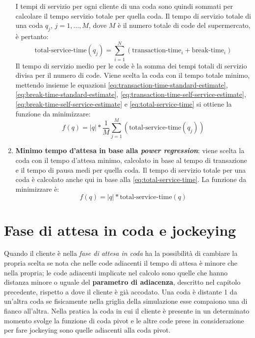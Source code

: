 \begin{enumerate}
I tempi di servizio per ogni cliente di una coda sono quindi sommati per calcolare il tempo servizio totale per quella coda. Il tempo di servizio totale di una coda $q_j$, $j = 1,\ldots ,M$, dove $M$ è il numero totale di code del supermercato, è pertanto:
\begin{equation}\label{eq:total-service-time}
\text{total-service-time}(q_j) = \sum\limits_{i=1}^N \left( \text{transaction-time}_i + \text{break-time}_i \right)
\end{equation}
Il tempo di servizio medio per le code è la somma dei tempi totali di servizio divisa per il numero di code. Viene scelta la coda con il tempo totale minimo, mettendo insieme le equazioni
 \ref{eq:transaction-time-standard-estimate}, \ref{eq:break-time-standard-estimate}, \ref{eq:transaction-time-self-service-estimate}, \ref{eq:break-time-self-service-estimate} e \ref{eq:total-service-time} si ottiene la funzione da minimizzare:
\begin{equation}
f(q) = |q| * \frac{1}{M}\sum\limits_{j=1}^M \left( \text{total-service-time}(q_j) \right)
\end{equation}
\item \textbf{Minimo tempo d'attesa in base alla \textit{power regression}}: viene scelta la coda con il tempo d'attesa minimo, calcolato in base al tempo di transazione e il tempo di pausa medi per quella coda. Il tempo di servizio totale per una coda è calcolato anche qui in base alla \ref{eq:total-service-time}. La funzione da minimizzare è:
\begin{equation}
f(q) = |q| * \text{total-service-time}(q)
\end{equation}
\end{enumerate}

\section{Fase di attesa in coda e jockeying}

Quando il cliente è nella \textit{fase di attesa in coda} ha la possibilità di cambiare la propria scelta se nota che nelle code adiacenti il tempo di attesa è minore che nella propria; le code adiacenti implicate nel calcolo sono quelle che hanno distanza minore o uguale del \textbf{parametro di adiacenza}, descritto nel capitolo precedente, rispetto a dove il cliente è già accodato. Una coda è distante 1 da un'altra coda se fisicamente nella griglia della simulazione esse compaiono una di fianco all'altra. Nella pratica la coda in cui il cliente è presente in un determinato momento svolge la funzione di coda pivot e le altre code prese in considerazione per fare jockeying sono quelle adiacenti alla coda pivot.

